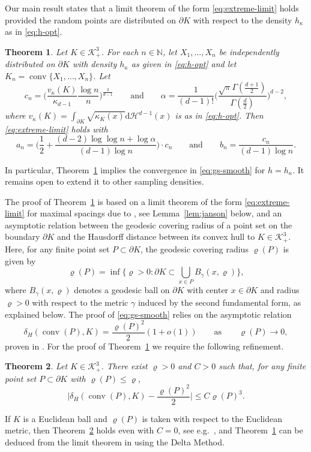 \documentclass[a4paper,12pt,reqno]{amsart}
\newtheorem{thm}{Theorem}
\theoremstyle{definition}
\newcommand{\IN}{\mathbb{N}}
\newcommand{\cH}{\mathcal{H}}
\newcommand{\cK}{\mathcal{K}}
\DeclareMathOperator{\conv}{conv}
\newcommand{\dd}{\mathrm{d}}
\begin{document}
Our main result states that a limit theorem of the form \eqref{eq:extreme-limit} holds provided the random points are distributed on $\partial K$ with respect to the density $h_{\kappa}$ as in \eqref{eq:h-opt}. 

\begin{thm}\label{thm:main}
Let $K\in \cK^3_+$. For each $n\in \IN$, let $X_1,\dots,X_n$ be independently distributed on $\partial K$ with density $h_{\kappa}$ as given in \eqref{eq:h-opt} and let $K_n=\conv\{X_1,\dots,X_n\}$.  Let 
\[
c_n=\Big(\frac{v_{\kappa}(K)}{\kappa_{d-1}}\frac{\log n}{n}\Big)^{\frac{2}{d-1}} \qquad \text{and}\qquad \alpha=\frac{1}{(d-1)!}\Big(\frac{\sqrt{\pi}\Gamma(\frac{d+1}{2})}{\Gamma(\frac{d}{2})}\Big)^{d-2},
\]
where $v_{\kappa}(K)=\int_{\partial K} \sqrt{\kappa_K(x)}\dd \cH^{d-1}(x)$ is as in \eqref{eq:h-opt}. Then \eqref{eq:extreme-limit} holds with
\[
a_n=\Big(\frac{1}{2}+\frac{(d-2)\log\log n+\log \alpha}{(d-1)\log n}\Big)\cdot c_n \qquad \text{and}\qquad b_n=\frac{c_n}{(d-1)\log n}.
\]
\end{thm}

In particular, Theorem~\ref{thm:main} implies the convergence in \eqref{eq:gs-smooth} for $h=h_{\kappa}$. It remains open to extend it to other sampling densities. 


The proof of Theorem~\ref{thm:main} is based on a limit theorem of the form \eqref{eq:extreme-limit} for maximal spacings due to \cite{Jan87}, see Lemma~\ref{lem:janson} below, and an asymptotic relation between the geodesic covering radius of a point set on the boundary $\partial K$ and the Hausdorff distance between its convex hull to $K\in \cK^3_+$. Here, for any finite point set $P\subset \partial K$, the geodesic covering radius $\varrho(P)$ is given by
\[
\varrho(P)
=\inf\Big\{\varrho>0\colon \partial K\subset \bigcup_{x\in P} B_{\gamma}(x,\varrho)\Big\},
\]
where $B_{\gamma}(x,\varrho)$ denotes a geodesic ball on $\partial K$ with center $x\in \partial K$ and radius $\varrho>0$ with respect to the metric $\gamma$ induced by the second fundamental form, as explained below.  The proof of \eqref{eq:gs-smooth} relies on the asymptotic relation
\begin{equation*} 
\delta_H(\conv(P),K)
=\frac{\varrho(P)^2}{2}(1+o(1))\qquad \text{as}\qquad \varrho(P)\to 0,
\end{equation*}
proven in \cite[Theorem~4]{Gru93}. For the proof of Theorem~\ref{thm:main} we require the following refinement.

\begin{thm}\label{thm:hd-covering}
Let $K\in \cK^3_+$. There exist $\varrho>0$ and $C>0$ such that, for any finite point set $P\subset \partial K$ with $\varrho(P)\le \varrho$,
\[
\Big|\delta_H(\conv(P),K)-\frac{\varrho(P)^2}{2}\Big|\le C\varrho(P)^3.
\]
\end{thm}
	If $K$ is a Euclidean ball and $\varrho(P)$ is taken with respect to the Euclidean metric, then Theorem~\ref{thm:hd-covering} holds even with $C=0$, see e.g.~\cite[Lemma 7.1]{BW03}, and Theorem~\ref{thm:main} can be deduced from the limit theorem in \cite[Theorem 3.2]{Ser23} using the Delta Method. 
\end{document}
